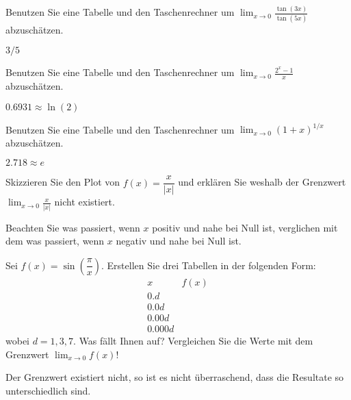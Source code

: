 \begin{exercises}
\begin{exercise} 
Benutzen Sie eine Tabelle und den Taschenrechner um $\lim_{x\to 0}\frac{\tan(3x)}{\tan(5x)}$ abzuschätzen.
\begin{answer}
  $3/5$
\end{answer}
\end{exercise}

\begin{exercise} 
Benutzen Sie eine Tabelle und den Taschenrechner um $\lim_{x\to 0}
\frac{2^x-1}{x}$ abzuschätzen.
\begin{answer}
  $0.6931\approx\ln(2)$
\end{answer}
\end{exercise}

\begin{exercise} 
Benutzen Sie eine Tabelle und den Taschenrechner um $\lim_{x\to 0} (1+x)^{1/x}$ abzuschätzen. 
\begin{answer}
  $2.718 \approx e$
\end{answer}
\end{exercise}



\begin{exercise} 
Skizzieren Sie den Plot von $f(x) = \dfrac{x}{|x|}$ und erklären Sie weshalb der Grenzwert $\lim_{x\to
  0} \frac{x}{|x|}$ nicht existiert.
\begin{answer}
  Beachten Sie was passiert, wenn $x$ positiv und nahe bei Null ist, verglichen mit dem was passiert, wenn $x$ negativ und nahe bei Null ist.
\end{answer}
\end{exercise}



\begin{exercise} 
Sei $f(x) = \sin\left(\dfrac{\pi}{x}\right)$. Erstellen Sie drei Tabellen in der folgenden Form:
\[
\begin{array}{l|l}
 x & f(x) \\ \hline
 0.d &   \\
 0.0d &  \\
 0.00d &   \\
 0.000d &  
\end{array}
\]
wobei $d = 1,3,7$. Was fällt Ihnen auf? Vergleichen Sie die Werte mit dem Grenzwert $\lim_{x\to 0} f(x)$!
\begin{answer}
  Der Grenzwert existiert nicht, so ist es nicht überraschend, dass die Resultate so unterschiedlich sind.
\end{answer}
\end{exercise}



\end{exercises}
